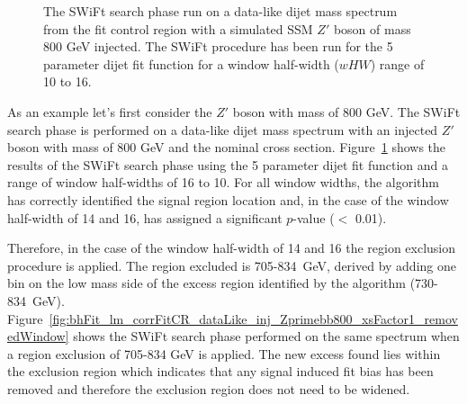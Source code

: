 \begin{figure}[!b]
{}
\vspace{-0.3em}
\caption[The SWiFt search phase run on a data-like dijet mass spectrum
          from the fit control region with a simulated SSM $Z'$ boson of mass 800 GeV injected.]
        {\label{fig:bhFit_lm_corrFitCR_dataLike_inj_Zprimebb800_xsFactor1}
          The SWiFt search phase run on a data-like dijet mass spectrum
          from the fit control region with a simulated SSM $Z'$ boson of mass 800 GeV injected.
          The SWiFt procedure has been run for the 5 parameter dijet fit function for a window half-width ($wHW$) range of 10 to 16.
}
\vspace{-0.7em}
\end{figure}

As an example let's first consider the $Z'$ boson with mass of 800 GeV.
The SWiFt search phase is performed on a data-like dijet mass spectrum
with an injected  $Z'$ boson with mass of 800 GeV and the nominal cross section.
Figure~\ref{fig:bhFit_lm_corrFitCR_dataLike_inj_Zprimebb800_xsFactor1}
shows the results of the SWiFt search phase
using the 5 parameter dijet fit function and a range of window half-widths of 16 to 10.
For all window widths, the \bh{} algorithm has correctly identified the signal region location
and, in the case of the window half-width of 14 and 16, has assigned a significant \mbox{\mbox{$p$-value}} ($<$ 0.01).


Therefore, in the case of the window half-width of 14 and 16 the region exclusion procedure is applied.
The region excluded is 705-834~GeV, derived by adding one bin on the low mass side of the excess region identified by the \bh{} algorithm (730-834~GeV).
Figure~\ref{fig:bhFit_lm_corrFitCR_dataLike_inj_Zprimebb800_xsFactor1_removedWindow} shows the SWiFt search phase
performed on the same spectrum when a region exclusion of 705-834 GeV is applied.
The new excess found lies within the exclusion region which indicates that any signal induced fit bias has been removed
and therefore the exclusion region does not need to be widened.

